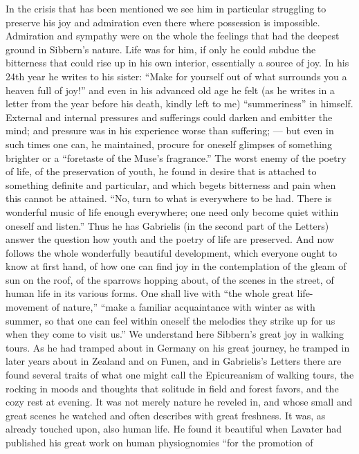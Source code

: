 \documentclass[12pt,a4paper,openany]{book}
\newcommand{\opage}[1]{\marginnote{\footnotesize\textit{[#1]}}}
\begin{document}
In the crisis that has been mentioned we see him in particular struggling
to preserve his joy and admiration even there where
possession is impossible. Admiration and sympathy were on the whole
the feelings that had the deepest ground in Sibbern's nature.
Life was for him, if only he could subdue the
bitterness that could rise up in his own interior, essentially a
source of joy. In his 24th year he writes to his sister:
``Make for yourself out of what surrounds you a heaven full of joy!''
and even in his advanced old age he felt (as he writes in
a letter from the year before his death, kindly left to me)
``summeriness'' in himself. External and internal pressures and sufferings
could darken and embitter the mind; and pressure was in his
experience worse than suffering; --- but even in such times one
can, he maintained, procure for oneself glimpses of something brighter or a
``foretaste of the Muse's fragrance.'' The worst enemy of
the poetry of life, of the preservation of youth, he found in desire
that is attached to something definite and particular, and which begets
bitterness and pain when this cannot be attained. ``No, turn
to what is everywhere to be had. There is wonderful music of life
enough everywhere; one need only become quiet within oneself and listen.''
Thus he has Gabrielis (in the second part of the Letters)
answer the question how youth and the poetry of life
are preserved. And now follows the whole wonderfully beautiful
development, which everyone ought to know at first hand, of how
one can find joy in the contemplation of the gleam of sun on
the roof, of the sparrows hopping about, of the scenes in
the street, of human life in its various forms. One
shall live with ``the whole great life-movement of nature,'' ``make a
familiar acquaintance with winter as with summer, so
that one can feel within oneself the melodies they strike up for us
when they come to visit us.'' We understand here Sibbern's great
joy in walking tours. As he had tramped about in Germany
\opage{69}on his great journey, he tramped in later years about in
Zealand and on Funen, and in Gabrielis's Letters there are found several
traits of what one might call the Epicureanism of walking tours,
the rocking in moods and thoughts that solitude in
field and forest favors, and the cozy rest at
evening. It was not merely nature he reveled in, and
whose small and great scenes he watched and often describes with
great freshness. It was, as already touched upon, also
human life. He found it beautiful when Lavater had published his
great work on human physiognomies ``for the promotion of
\end{document}
